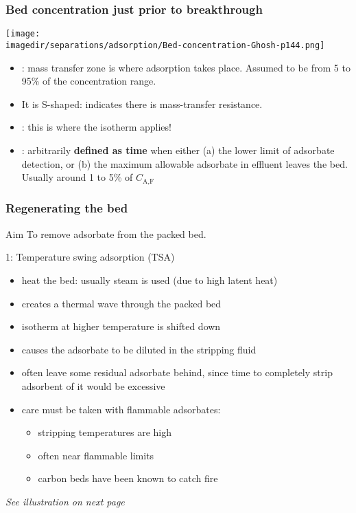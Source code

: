 \begin{frame}\frametitle{Bed concentration just prior to breakthrough}
	\begin{center}
		\texttt{[image: \\imagedir/separations/adsorption/Bed-concentration-Ghosh-p144.png]}
	\end{center}
	\vspace{-12pt}
	\vspace{6pt}
	{\small
		\begin{itemize}
			\item	{\color{purple}{MTZ}}: mass transfer zone is where adsorption takes place. Assumed to be from 5 to 95\% of the concentration range.
			\item	It is S-shaped: indicates there is mass-transfer resistance.
			\item	{\color{purple}{Equilibrium zone}}: this is where the isotherm applies!
			\item	{\color{purple}{Breakthrough}}: arbitrarily \textbf{defined as time} when either (a)  the lower limit of adsorbate detection, or (b) the maximum allowable adsorbate in effluent leaves the bed. Usually around 1 to 5\% of $C_\text{A,F}$
		\end{itemize}
	}
\end{frame}

\begin{frame}\frametitle{Regenerating the bed}
	\begin{exampleblock}{Aim}
		To remove adsorbate from the packed bed.
	\end{exampleblock}

	1: Temperature swing adsorption (TSA)
	\begin{itemize}
		\item	heat the bed: usually steam is used (due to high latent heat)
		\item	creates a thermal wave through the packed bed
		\item	isotherm at higher temperature is shifted down
		\item	causes the adsorbate to be diluted in the stripping fluid
		\item	often leave some residual adsorbate behind, since time to completely strip adsorbent of it would be excessive
		\item	care must be taken with flammable adsorbates:
		\begin{itemize}
			\item	stripping temperatures are high
			\item	often near flammable limits
			\item	carbon beds have been known to catch fire
		\end{itemize}
	\end{itemize}
	\emph{See illustration on next page}
\end{frame}

